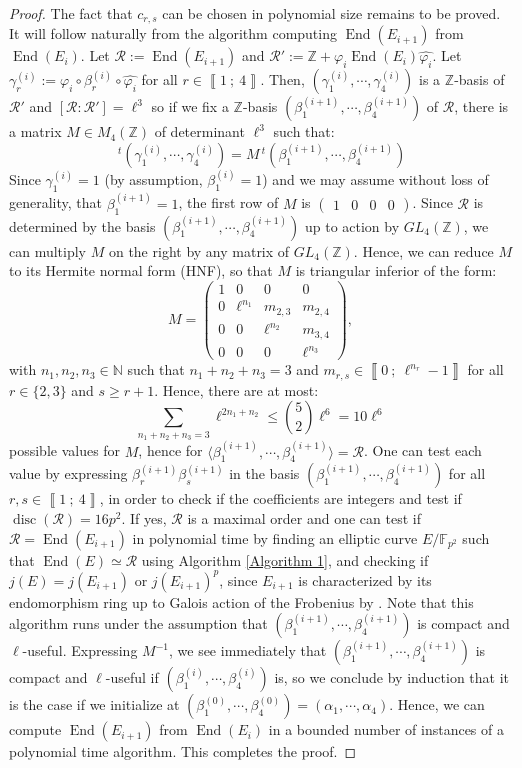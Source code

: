 \documentclass[a4paper,10pt,notitlepage]{report}
\theoremstyle{definition}
\theoremstyle{plain}
\theoremstyle{definition}
\newcommand{\N}{\mathbb{N}}
\newcommand{\Z}{\mathbb{Z}}
\newcommand{\F}{\mathbb{F}}
\newcommand{\m}[1]{\mathcal{#1}}
\renewcommand{\i}[2]{\left\llbracket #1~;~#2\right\rrbracket}
\renewcommand{\(}{\left(}
\renewcommand{\)}{\right)}
\DeclareMathOperator{\End}{End}
\DeclareMathOperator{\disc}{disc}
\begin{document}
\begin{proof}
The fact that $c_{r,s}$ can be chosen in polynomial size remains to be proved. It will follow naturally from the algorithm computing $\End(E_{i+1})$ from $\End(E_i)$. Let $\m{R}:=\End(E_{i+1})$ and $\m{R}':=\Z+\varphi_i\End(E_i)\widehat{\varphi_i}$.  Let $\gamma_r^{(i)}:=\varphi_i\circ\beta_r^{(i)}\circ\widehat{\varphi_i}$ for all $r\in\i{1}{4}$. Then, $(\gamma_1^{(i)},\cdots, \gamma_4^{(i)})$ is a $\Z$-basis of $\m{R}'$ and $[\m{R}:\m{R}']=\ell^3$ so if we fix a $\Z$-basis $(\beta_1^{(i+1)},\cdots, \beta_4^{(i+1)})$ of $\m{R}$, there is a matrix $M\in M_4(\Z)$ of determinant $\ell^3$ such that:
\[\,^t (\gamma_1^{(i)},\cdots, \gamma_4^{(i)})=M \,^t(\beta_1^{(i+1)},\cdots, \beta_4^{(i+1)})\]
Since $\gamma_1^{(i)}=1$ (by assumption, $\beta_1^{(i)}=1$) and we may assume without loss of generality, that $\beta_1^{(i+1)}=1$, the first row of $M$ is $(\begin{array}{cccc}
1 & 0 & 0 & 0
\end{array})$.  Since $\m{R}$ is determined by the basis $(\beta_1^{(i+1)},\cdots, \beta_4^{(i+1)})$ up to action by $GL_4(\Z)$, we can multiply $M$ on the right by any matrix of $GL_4(\Z)$. Hence, we can reduce $M$ to its Hermite normal form (HNF), so that $M$ is triangular inferior of the form:
\[M=\(\begin{array}{cccc}
1 & 0 & 0 & 0\\
0 & \ell^{n_1} & m_{2,3} & m_{2,4}\\
0 & 0 & \ell^{n_2} & m_{3,4} \\
0 & 0 & 0 & \ell^{n_3}
\end{array}\),\]
with $n_1,n_2,n_3\in\N$ such that $n_1+n_2+n_3=3$ and $m_{r,s}\in\i{0}{\ell^{n_r}-1}$ for all $r\in\{2,3\}$ and $s\geq r+1$. Hence, there are at most:
\[\sum_{n_1+n_2+n_3=3} \ell^{2n_1+n_2}\leq \binom{5}{2}\ell^{6}=10\ell^6\]
possible values for $M$, hence for $\langle\beta_1^{(i+1)},\cdots, \beta_4^{(i+1)}\rangle=\m{R}$. One can test each value by expressing $\beta_r^{(i+1)}\beta_s^{(i+1)}$ in the basis $(\beta_1^{(i+1)},\cdots, \beta_4^{(i+1)})$ for all $r,s\in\i{1}{4}$, in order to check if the coefficients are integers and test if $\disc(\m{R})=16p^2$.  If yes, $\m{R}$ is a maximal order and one can test if $\m{R}=\End(E_{i+1})$ in polynomial time by finding an elliptic curve $E/\F_{p^2}$ such that $\End(E)\simeq\m{R}$ using Algorithm \ref{Algorithm 1}, and checking if $j(E)=j(E_{i+1})$ or $j(E_{i+1})^p$, since $E_{i+1}$ is characterized by its endomorphism ring up to Galois action of the Frobenius by \cite[Lemma 42.4.1]{Voight}. Note that this algorithm runs under the assumption that $(\beta_1^{(i+1)},\cdots, \beta_4^{(i+1)})$ is compact and $\ell$-useful. Expressing $M^{-1}$, we see immediately that $(\beta_1^{(i+1)},\cdots, \beta_4^{(i+1)})$ is compact and $\ell$-useful if $(\beta_1^{(i)},\cdots, \beta_4^{(i)})$ is, so we conclude by induction that it is the case if we initialize at $(\beta_1^{(0)},\cdots, \beta_4^{(0)})=(\alpha_1,\cdots,\alpha_4)$. Hence, we can compute $\End(E_{i+1})$ from $\End(E_i)$ in a bounded number of instances of a polynomial time algorithm. This completes the proof. 
\end{proof}
\end{document}
